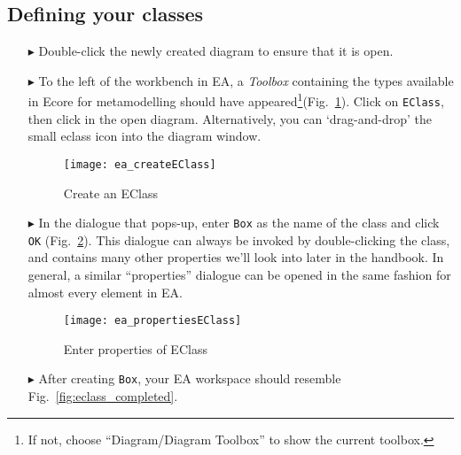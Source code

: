 \newpage
\subsection{Defining your classes}
\visHeader
\hypertarget{static:classes vis}{}

\vspace{0.5cm}

\begin{itemize}

\item[$\blacktriangleright$] Double-click the newly created diagram to ensure that it is open.

\vspace{0.5cm}

\item[$\blacktriangleright$] To the left of the workbench in EA, a \emph{Toolbox} containing the types available in Ecore for metamodelling should have
appeared\footnote{If not, choose ``Diagram/Diagram Toolbox'' to show the current toolbox.}(Fig.~\ref{fig:eclass}). Click on \texttt{EClass}, then click in the
open diagram. Alternatively, you can `drag-and-drop' the small eclass icon into the diagram window.

\vspace{0.5cm}

\begin{figure}[htbp]
	\centering
  \texttt{[image: ea\_createEClass]}
	\caption{Create an EClass}
	\label{fig:eclass}
\end{figure}

\vspace{0.5cm}

\item[$\blacktriangleright$] In the dialogue that pops-up, enter \texttt{Box} as the name of the class and click \texttt{OK} (Fig.~\ref{fig:eclass_properties}).
This dialogue can always be invoked by double-clicking the class, and contains many other properties we'll look into later in the handbook.
In general, a similar ``properties'' dialogue can be opened in the same fashion for almost every element in EA.

\begin{figure}[ht]
	\centering
  \texttt{[image: ea\_propertiesEClass]}
	\caption{Enter properties of EClass}
	\label{fig:eclass_properties}
\end{figure}

\newpage
\vspace*{0.5cm}
\item[$\blacktriangleright$] After creating \texttt{Box}, your EA workspace should resemble Fig.~\ref{fig:eclass_completed}.


\end{itemize}
